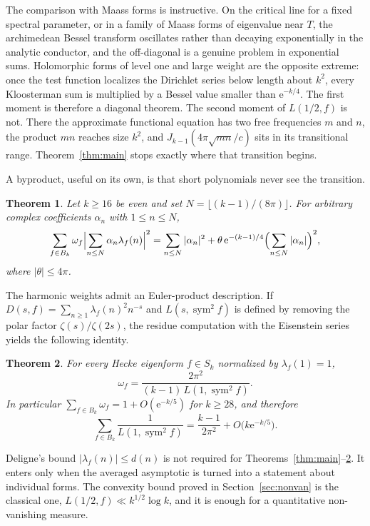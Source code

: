 \documentclass[11pt]{amsart}
\newtheorem{theorem}{Theorem}[section]
\theoremstyle{definition}
\theoremstyle{remark}
\numberwithin{equation}{section}
\DeclareMathOperator{\sym}{sym}
\newcommand{\ee}{\mathrm{e}}
\begin{document}
The comparison with Maass forms is instructive. On the critical line for a fixed spectral parameter, or in a family of Maass forms of eigenvalue near $T$, the archimedean Bessel transform oscillates rather than decaying exponentially in the analytic conductor, and the off-diagonal is a genuine problem in exponential sums. Holomorphic forms of level one and large weight are the opposite extreme: once the test function localizes the Dirichlet series below length about $k^2$, every Kloosterman sum is multiplied by a Bessel value smaller than $\ee^{-k/4}$. The first moment is therefore a diagonal theorem. The second moment of $L(1/2,f)$ is not. There the approximate functional equation has two free frequencies $m$ and $n$, the product $mn$ reaches size $k^2$, and $J_{k-1}(4\pi\sqrt{mn}/c)$ sits in its transitional range. Theorem~\ref{thm:main} stops exactly where that transition begins.

A byproduct, useful on its own, is that short polynomials never see the transition.

\begin{theorem}\label{thm:short}
Let $k\ge 16$ be even and set $N=\lfloor(k-1)/(8\pi)\rfloor$. For arbitrary complex coefficients $\alpha_n$ with $1\le n\le N$,
\[
\sum_{f\in B_k}\omega_f\Bigl|\sum_{n\le N}\alpha_n\lambda_f(n)\Bigr|^2
=\sum_{n\le N}|\alpha_n|^2+\theta\,\ee^{-(k-1)/4}\Bigl(\sum_{n\le N}|\alpha_n|\Bigr)^2,
\]
where $|\theta|\le 4\pi$.
\end{theorem}

The harmonic weights admit an Euler-product description. If $D(s,f)=\sum_{n\ge 1}\lambda_f(n)^2 n^{-s}$ and $L(s,\sym^2 f)$ is defined by removing the polar factor $\zeta(s)/\zeta(2s)$, the residue computation with the Eisenstein series yields the following identity.

\begin{theorem}\label{thm:weight}
For every Hecke eigenform $f\in S_k$ normalized by $\lambda_f(1)=1$,
\begin{equation}\label{eq:omega-sym}
\omega_f=\frac{2\pi^2}{(k-1)\,L(1,\sym^2 f)}.
\end{equation}
In particular $\sum_{f\in B_k}\omega_f=1+O(\ee^{-k/5})$ for $k\ge 28$, and therefore
\[
\sum_{f\in B_k}\frac{1}{L(1,\sym^2 f)}=\frac{k-1}{2\pi^2}+O\bigl(k\ee^{-k/5}\bigr).
\]
\end{theorem}

Deligne's bound $\lvert\lambda_f(n)\rvert\le d(n)$ is not required for Theorems~\ref{thm:main}--\ref{thm:weight}. It enters only when the averaged asymptotic is turned into a statement about individual forms. The convexity bound proved in Section~\ref{sec:nonvan} is the classical one, $L(1/2,f)\ll k^{1/2}\log k$, and it is enough for a quantitative non-vanishing measure.
\end{document}

